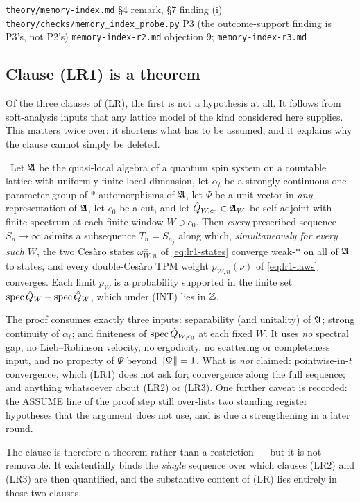 {\texttt{theory/memory-index.md} \S4 remark, \S7 finding (i)}
{\texttt{theory/checks/memory\_index\_probe.py} P3 (the outcome-support
 finding is P3's, not P2's)}
{\texttt{memory-index-r2.md} objection 9; \texttt{memory-index-r3.md}}

\subsection{Clause (LR1) is a theorem}

Of the three clauses of (LR), the first is not a hypothesis at all. It
follows from soft-analysis inputs that any lattice model of the kind
considered here supplies. This matters twice over: it shortens what has to be
assumed, and it explains why the clause cannot simply be deleted.

\begin{theorem}
\label{thm:lr1-gen}
\statusProved\
Let $\mathfrak{A}$ be the quasi-local algebra of a quantum spin system on a countable
lattice with uniformly finite local dimension, let $\alpha_t$ be a strongly
continuous one-parameter group of $*$-automorphisms of $\mathfrak{A}$, let $\Psi$ be a
unit vector in \emph{any} representation of $\mathfrak{A}$, let $c_0$ be a cut, and
let $\hat{Q}_{W,c_0}\in\mathfrak{A}_W$ be self-adjoint with finite spectrum at each
finite window $W\ni c_0$. Then \emph{every} prescribed sequence $S_n\to\infty$
admits a subsequence $T_n=S_{n_j}$ along which, \emph{simultaneously for every
such $W$}, the two Cesàro states $\omega^{\pm}_{W,n}$ of
\eqref{eq:lr1-states} converge weak-$*$ on all of $\mathfrak{A}$ to states, and every
double-Cesàro TPM weight $p_{W,n}(\nu)$ of \eqref{eq:lr1-laws} converges.
Each limit $p_W$ is a probability supported in the finite set
$\operatorname{spec}\hat{Q}_W-\operatorname{spec}\hat{Q}_W$, which under (INT) lies in $\mathbb{Z}$.
\end{theorem}

\begin{scope}
The proof consumes exactly three inputs: separability (and unitality) of
$\mathfrak{A}$; strong continuity of $\alpha_t$; and finiteness of
$\operatorname{spec}\hat{Q}_{W,c_0}$ at each fixed $W$. It uses \emph{no} spectral gap, no
Lieb--Robinson velocity, no ergodicity, no scattering or completeness input,
and no property of $\Psi$ beyond $\lVert \Psi\rVert=1$. What is \emph{not} claimed:
pointwise-in-$t$ convergence, which (LR1) does not ask for; convergence along
the full sequence; and anything whatsoever about (LR2) or (LR3). One further
caveat is recorded: the ASSUME line of the proof step still over-lists two
standing register hypotheses that the argument does not use, and is due a
strengthening in a later round.

The clause is therefore a theorem rather than a restriction --- but it is not
removable. It existentially binds the \emph{single} sequence over which
clauses (LR2) and (LR3) are then quantified, and the substantive content of
(LR) lies entirely in those two clauses.
\end{scope}


